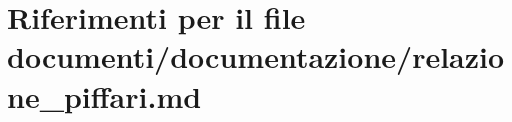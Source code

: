 \hypertarget{relazione__piffari_8md}{}\section{Riferimenti per il file documenti/documentazione/relazione\+\_\+piffari.md}
\label{relazione__piffari_8md}
